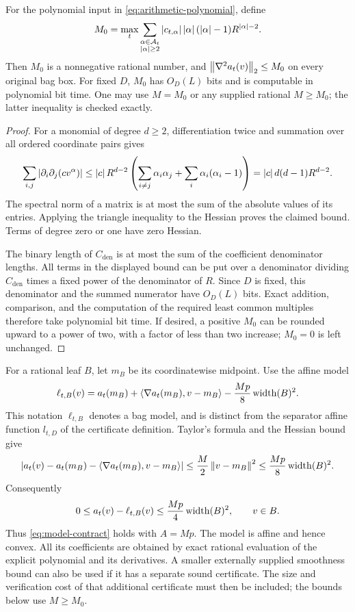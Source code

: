 \begin{proposition}
\label{prop:arithmetic-hessian}
For the polynomial input in \cref{eq:arithmetic-polynomial}, define
\[
 M_0=\max_t\sum_{\substack{\alpha\in\mathcal A_t\\\left\lvert \alpha\right\rvert\ge2}}
 \left\lvert c_{t,\alpha}\right\rvert\left\lvert \alpha\right\rvert(\left\lvert \alpha\right\rvert-1)
 R^{\left\lvert \alpha\right\rvert-2}.
\]
Then $M_0$ is a nonnegative rational number, and
$\left\lVert \nabla^2a_t(v)\right\rVert_2\le M_0$ on every original bag box.  For fixed $D$,
$M_0$ has $O_D(L)$ bits and is computable in polynomial bit time.  One may use
$M=M_0$ or any supplied rational $M\ge M_0$; the latter inequality is
checked exactly.
\end{proposition}

\begin{proof}
For a monomial of degree $d\ge2$, differentiation twice and summation over all
ordered coordinate pairs gives
\[
 \sum_{i,j}\left\lvert \partial_i\partial_j(c v^\alpha)\right\rvert
 \le \left\lvert c\right\rvert R^{d-2}
 \left(\sum_{i\ne j}\alpha_i\alpha_j+
       \sum_i\alpha_i(\alpha_i-1)\right)
 =\left\lvert c\right\rvert d(d-1)R^{d-2}.
\]
The spectral norm of a matrix is at most the sum of the absolute values of
its entries.  Applying the triangle inequality to the Hessian proves the
claimed bound.  Terms of degree zero or one have zero Hessian.

The binary length of $C_{\mathrm{den}}$ is at most the sum of the coefficient
denominator lengths.  All terms in the displayed bound can be put over a
denominator dividing $C_{\mathrm{den}}$ times a fixed
power of the denominator of $R$.  Since $D$ is fixed, this denominator and
the summed numerator have $O_D(L)$ bits.  Exact addition, comparison, and the
computation of the required least common multiples therefore take polynomial
bit time.  If desired, a positive $M_0$ can be rounded upward to a power of
two, with a factor of less than two increase; $M_0=0$ is left unchanged.
\end{proof}

For a rational leaf $B$, let $m_B$ be its coordinatewise midpoint.  Use the
affine model
\begin{equation}
 \ell_{t,B}(v)=a_t(m_B)+\left\langle \nabla a_t(m_B),v-m_B\right\rangle
                  -\frac{Mp}{8}\operatorname{width}(B)^2.
 \label{eq:arithmetic-taylor}
\end{equation}
This notation $\ell_{t,B}$ denotes a bag model, and is distinct from the
separator affine function $l_{t,D}$ of the certificate definition.
Taylor's formula and the Hessian bound give
\[
 \left\lvert a_t(v)-a_t(m_B)-\left\langle \nabla a_t(m_B),v-m_B\right\rangle\right\rvert
 \le \frac M2\left\lVert v-m_B\right\rVert^2
 \le\frac{Mp}{8}\operatorname{width}(B)^2.
\]
Consequently
\[
 0\le a_t(v)-\ell_{t,B}(v)
       \le\frac{Mp}{4}\operatorname{width}(B)^2,
 \qquad v\in B.
\]
Thus \cref{eq:model-contract} holds with $A=Mp$.  The model is affine and
hence convex.  All its coefficients are obtained by exact rational
evaluation of the explicit polynomial and its derivatives.  A smaller
externally supplied smoothness bound can also be used if it has a separate
sound certificate.  The size and verification cost of that additional
certificate must then be included; the bounds below use $M\ge M_0$.

